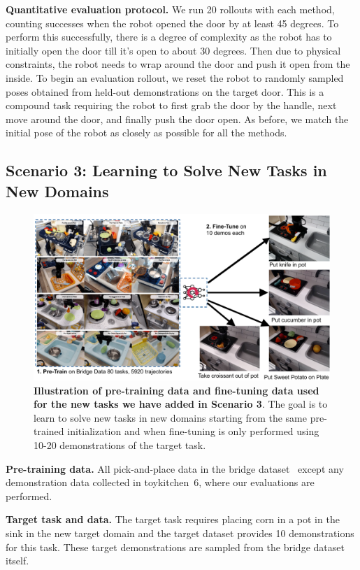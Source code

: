\documentclass[../thesis.tex]{subfiles}
\begin{document}
\textbf{Quantitative evaluation protocol.} We run 20 rollouts with each method, counting successes when the robot opened the door by at least 45 degrees. To perform this successfully, there is a degree of complexity as the robot has to initially open the door till it's open to about 30 degrees. Then due to physical constraints, the robot needs to wrap around the door and push it open from the inside. To begin an evaluation rollout, we reset the robot to randomly sampled poses obtained from held-out demonstrations on the target door.  This is a compound task requiring the robot to first grab the door by the handle, next move around the door, and finally push the door open. As before, we match the initial pose of the robot as closely as possible for all the methods. 


\subsection{Scenario 3: Learning to Solve New Tasks in New Domains}

\begin{figure}
\centering
  \includegraphics[width=0.83\linewidth]{chapters/ptr/scenario3_overview.pdf}
  \caption{\footnotesize {\textbf{Illustration of pre-training data and fine-tuning data used for the new tasks we have added in Scenario 3}. The goal is to learn to solve new tasks in new domains starting from the same pre-trained initialization and when fine-tuning is only performed using 10-20 demonstrations of the target task.}}
  \label{fig:scenario4_overview}
\end{figure}

\textbf{Pre-training data.} All pick-and-place data in the bridge dataset~\citep{ebert2021bridge} except any demonstration data collected in toykitchen~6, where our evaluations are performed.

\textbf{Target task and data.} The target task requires placing corn in a pot in the sink in the new target domain and the target dataset provides 10 demonstrations for this task. These target demonstrations are sampled from the bridge dataset itself.
\end{document}
